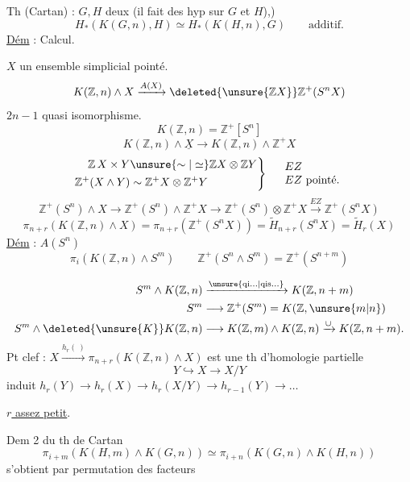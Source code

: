 
Th (Cartan) : $G,H$ deux   (il fait des hyp sur $G$ et $H$),)
\[
H_*(K(G,n),H)\simeq H_*(K(H,n),G)\qquad\text{additif.}
\]
\uline{Dém} : Calcul.

$X$ un ensemble simplicial pointé.
\[
K(\mathbb Z,n)\wedge X\xrightarrow{A(X)}\deleted{\unsure{\mathbb Z X}}\mathbb Z^{+}(S^nX)
\]
$2n-1$ quasi isomorphisme.
\[
K(\mathbb Z,n)=\mathbb Z^{+}[S^n]
\]
\[
K(\mathbb Z,n)\wedge\underline X\longrightarrow K(\mathbb Z,n)\wedge\mathbb Z^+X
\]
\[
\left.\begin{aligned}
\mathbb Z\,X\times Y&\unsure{\sim|\simeq}\mathbb ZX\otimes\mathbb ZY\\
\mathbb Z^+(X\wedge Y)&\sim\mathbb Z^+X\otimes\mathbb Z^+Y
\end{aligned}\right\}\quad
\begin{array}{l}EZ\\ EZ\ \text{pointé.}\end{array}
\]
\[
\mathbb Z^+(S^n)\wedge X\longrightarrow\mathbb Z^+(S^n)\wedge\mathbb Z^+X
\longrightarrow\mathbb Z^+(S^n)\otimes\mathbb Z^+X\xrightarrow{EZ}\mathbb Z^+(S^nX)
\]
\[
\pi_{n+r}(K(\mathbb Z,n)\wedge X)=\pi_{n+r}(\mathbb Z^+(S^nX))
=\widetilde H_{n+r}(S^nX)=\widetilde H_r(X)
\]
\uline{Dém} : $A(S^n)$
\[
\pi_i(K(\mathbb Z,n)\wedge S^m)\qquad
\mathbb Z^+(S^n\wedge S^m)=\mathbb Z^+(S^{n+m})
\]

\noindent{}
\[
\begin{aligned}
S^m\wedge K(\mathbb Z,n)&\xrightarrow{\unsure{\mathrm{qi}\ldots|\mathrm{qis}\ldots}} K(\mathbb Z,n+m)\\
S^m&\longrightarrow\mathbb Z^+(S^m)=K(\mathbb Z,\unsure{m|n})\\
S^m\wedge\deleted{\unsure{K}}K(\mathbb Z,n)&\longrightarrow K(\mathbb Z,m)\wedge K(\mathbb Z,n)\xrightarrow{\cup}K(\mathbb Z,n+m).
\end{aligned}
\]
Pt clef : $X\xrightarrow{h_r(\ )}\pi_{n+r}(K(\mathbb Z,n)\wedge X)$ est une th d'homologie partielle
\[
Y\hookrightarrow X\longrightarrow X/Y
\]
induit $h_r(Y)\longrightarrow h_r(X)\longrightarrow h_r(X/Y)\longrightarrow h_{r-1}(Y)\longrightarrow\ldots$

\uline{$r$ assez petit}.

Dem 2 du th de Cartan
\[
\pi_{i+m}(K(H,m)\wedge K(G,n))\simeq\pi_{i+n}(K(G,n)\wedge K(H,n))
\]
s'obtient par permutation des facteurs
